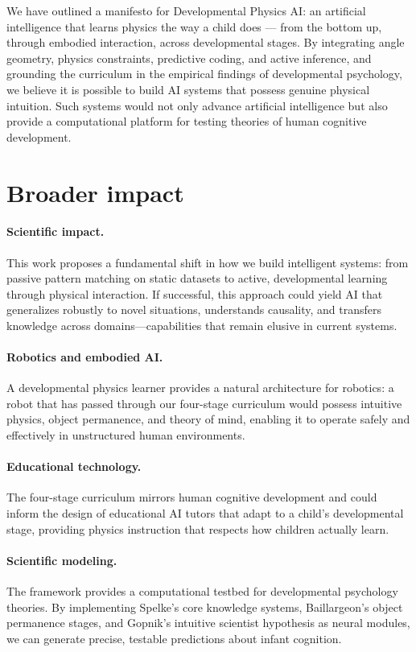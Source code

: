 \documentclass[11pt,oneside]{article}
\begin{document}
We have outlined a manifesto for Developmental Physics AI: an artificial intelligence that learns physics the way a child does --- from the bottom up, through embodied interaction, across developmental stages. By integrating angle geometry, physics constraints, predictive coding, and active inference, and grounding the curriculum in the empirical findings of developmental psychology, we believe it is possible to build AI systems that possess genuine physical intuition. Such systems would not only advance artificial intelligence but also provide a computational platform for testing theories of human cognitive development.

\section*{Broader impact}

\paragraph{Scientific impact.}
This work proposes a fundamental shift in how we build intelligent systems: from passive pattern matching on static datasets to active, developmental learning through physical interaction. If successful, this approach could yield AI that generalizes robustly to novel situations, understands causality, and transfers knowledge across domains---capabilities that remain elusive in current systems.

\paragraph{Robotics and embodied AI.}
A developmental physics learner provides a natural architecture for robotics: a robot that has passed through our four-stage curriculum would possess intuitive physics, object permanence, and theory of mind, enabling it to operate safely and effectively in unstructured human environments.

\paragraph{Educational technology.}
The four-stage curriculum mirrors human cognitive development and could inform the design of educational AI tutors that adapt to a child's developmental stage, providing physics instruction that respects how children actually learn.

\paragraph{Scientific modeling.}
The framework provides a computational testbed for developmental psychology theories. By implementing Spelke's core knowledge systems, Baillargeon's object permanence stages, and Gopnik's intuitive scientist hypothesis as neural modules, we can generate precise, testable predictions about infant cognition.
\end{document}

